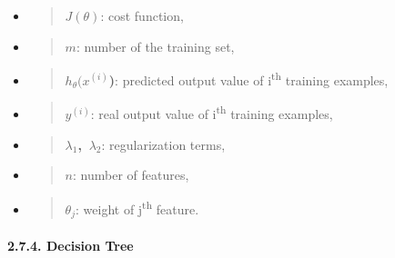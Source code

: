 \documentclass[
]{article}
\begin{document}
\begin{itemize}
\item
  \begin{quote}
  \(J(\theta)\): cost function,
  \end{quote}
\item
  \begin{quote}
  \(m\): number of the training set,
  \end{quote}
\item
  \begin{quote}
  \(h_{\theta}(x^{(i)}\)\textbf{)}: predicted output value of
  i\textsuperscript{th} training examples,
  \end{quote}
\item
  \begin{quote}
  \(y^{(i)}\): real output value of i\textsuperscript{th} training
  examples,
  \end{quote}
\item
  \begin{quote}
  \(\lambda_{1}\)\textbf{,} \({\ \lambda}_{2}\): regularization terms,
  \end{quote}
\item
  \begin{quote}
  \(n\): number of features,
  \end{quote}
\item
  \begin{quote}
  \(\theta_{j}\): weight of j\textsuperscript{th} feature.
  \end{quote}
\end{itemize}

\hypertarget{decision-tree}{%
\paragraph{\texorpdfstring{\textbf{2.7.4. Decision
Tree}}{2.7.4. Decision Tree}}\label{decision-tree}}
\end{document}
